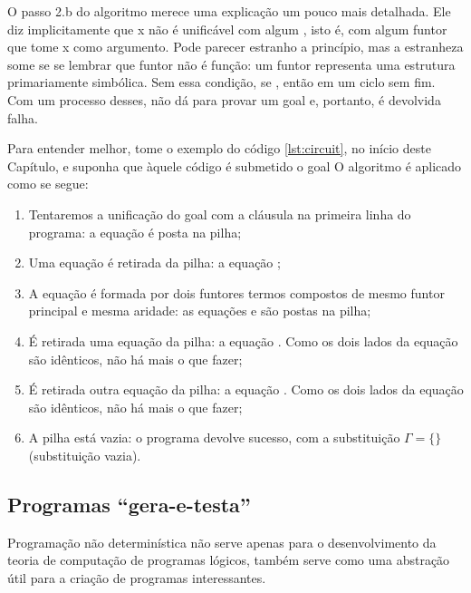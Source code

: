 O passo 2.b do algoritmo merece uma explicação um pouco mais detalhada. Ele diz implicitamente que x não é unificável com algum , isto é, com algum funtor que tome x como argumento. Pode parecer estranho a princípio, mas a estranheza some se se lembrar que funtor não é função: um funtor representa uma estrutura primariamente simbólica. Sem essa condição, se , então  em um ciclo sem fim. Com um processo desses, não dá para provar um goal e, portanto, é devolvida falha.

Para entender melhor, tome o exemplo do código \ref{lst:circuit}, no início deste Capítulo, e suponha que àquele código é submetido o goal  O algoritmo é aplicado como se segue:

  \begin{enumerate}
    \item Tentaremos a unificação do goal com a cláusula na primeira linha do programa: a equação  é posta na pilha;
    \item Uma equação é retirada da pilha: a equação ;
    \item A equação é formada por dois funtores termos compostos de mesmo funtor principal e mesma aridade: as equações  e  são postas na pilha;
    \item É retirada uma equação da pilha: a equação . Como os dois lados da equação são idênticos, não há mais o que fazer;
    \item É retirada outra equação da pilha: a equação . Como os dois lados da equação são idênticos, não há mais o que fazer;
    \item A pilha está vazia: o programa devolve sucesso, com a substituição $\Gamma = \{\}$ (substituição vazia).
  \end{enumerate}


  \subsection{Programas ``gera-e-testa''}

  Programação não determinística não serve apenas para o desenvolvimento da teoria de computação de programas lógicos, também serve como uma abstração útil para a criação de programas interessantes.

